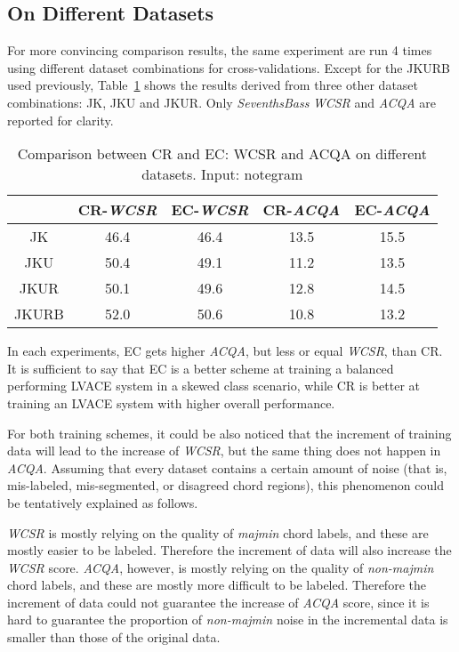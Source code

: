 \subsection{On Different Datasets}
For more convincing comparison results, the same experiment are run 4 times using different dataset combinations for cross-validations. Except for the JKURB used previously, Table~\ref{tab:datasize} shows the results derived from three other dataset combinations: JK, JKU and JKUR. Only \textit{SeventhsBass} \textit{WCSR} and \textit{ACQA} are reported for clarity.
\begin{table}[htb]
	\caption{Comparison between CR and EC: WCSR and ACQA on different datasets. Input: notegram}
	\centering
	\footnotesize
	\begin{tabular}{|c|c|c|c|c|} \hline
		& CR-\textit{WCSR} & EC-\textit{WCSR} & CR-\textit{ACQA} & EC-\textit{ACQA} \\ \hline
		JK & 46.4 & 46.4 & 13.5 & 15.5 \\ \hline
		JKU & 50.4 & 49.1 & 11.2 & 13.5 \\ \hline
		JKUR & 50.1 & 49.6 & 12.8 & 14.5 \\ \hline
		JKURB & 52.0 & 50.6 & 10.8 & 13.2 \\ \hline
	\end{tabular}
	\label{tab:datasize}
\end{table}
In each experiments, EC gets higher \textit{ACQA}, but less or equal \textit{WCSR}, than CR. It is sufficient to say that EC is a better scheme at training a balanced performing LVACE system in a skewed class scenario, while CR is better at training an LVACE system with higher overall performance.

For both training schemes, it could be also noticed that the increment of training data will lead to the increase of \textit{WCSR}, but the same thing does not happen in \textit{ACQA}. Assuming that every dataset contains a certain amount of noise (that is, mis-labeled, mis-segmented, or disagreed chord regions), this phenomenon could be tentatively explained as follows.

\textit{WCSR} is mostly relying on the quality of \textit{majmin} chord labels, and these are mostly easier to be labeled. Therefore the increment of data will also increase the \textit{WCSR} score. \textit{ACQA}, however, is mostly relying on the quality of \textit{non-majmin} chord labels, and these are mostly more difficult to be labeled. Therefore the increment of data could not guarantee the increase of \textit{ACQA} score, since it is hard to guarantee the proportion of \textit{non-majmin} noise in the incremental data is smaller than those of the original data.


